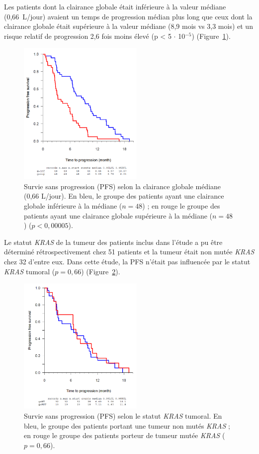 Les patients dont la clairance globale était inférieure à la valeur médiane (0,66~L/jour) avaient un temps de progression médian plus long que ceux dont la clairance globale était supérieure à la valeur médiane (8,9 mois vs 3,3 mois) et un risque relatif de progression 2,6 fois moins élevé (p < 5 $\cdot$ 10$^{-5}$) (Figure~\ref{fig:24}). 
\begin{figure}[htbp]
	\centering
		\includegraphics[width=6cm]{figures/raster/FIG_24}
	\caption{Survie sans progression (PFS) selon la clairance globale médiane (0,66 L/jour). En bleu, le groupe des patients ayant une clairance globale inférieure à la médiane ($n = 48$) ; en rouge le groupe des patients ayant une clairance globale supérieure à la médiane ($n = 48$) ($p < 0,00005$).}
	\label{fig:24}
\end{figure}
Le statut \textit{KRAS} de la tumeur des patients inclus dans l'étude a pu être déterminé rétrospectivement chez 51 patients et la tumeur était non mutée \textit{KRAS} chez 32 d'entre eux. Dans cette étude, la PFS n'était pas influencée par le statut \textit{KRAS} tumoral ($p = 0,66$) (Figure~\ref{fig:25}).
\begin{figure}[htbp]
	\centering
		\includegraphics[width=6cm]{figures/raster/FIG_25}
	\caption{Survie sans progression (PFS) selon le statut \textit{KRAS} tumoral. En bleu, le groupe des patients portant une tumeur non mutés \textit{KRAS} ; en rouge le groupe des patients porteur de tumeur mutée \textit{KRAS} ($p = 0,66$).}
	\label{fig:25}
\end{figure}
